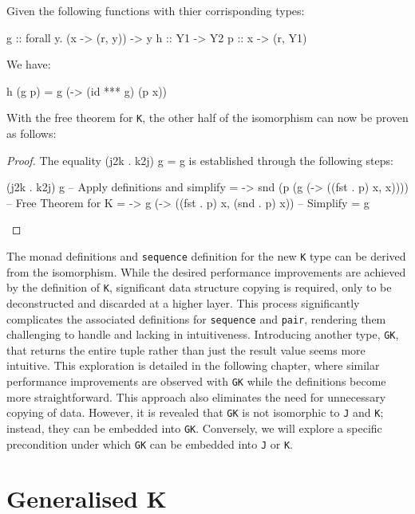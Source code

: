 \documentclass[runningheads]{llncs}
\begin{document}
\begin{theorem}
Given the following functions with thier corrisponding types:
  \begin{code}
  g :: forall y. (x -> (r, y)) -> y
  h :: Y1 -> Y2
  p :: x -> (r, Y1)
  \end{code}
  We have:
  \begin{code}
  h (g p) = g (\x -> (id *** g) (p x))
  \end{code}
\end{theorem}

With the free theorem for \texttt{K}, the other half of the isomorphism
can now be proven as follows:

\begin{proof}
The equality (j2k . k2j) g = g is established through the following steps:
  \begin{code}
  (j2k . k2j) g
  -- {{ Apply definitions and simplify}}
  = \p -> snd (p (g (\x -> ((fst . p) x, x))))
  -- {{ Free Theorem for K }}
  = \p -> g (\x -> ((fst . p) x, (snd . p) x))
  -- {{ Simplify }}
  = g
  \end{code}
\end{proof}

The monad definitions and \texttt{sequence} definition for the new
\texttt{K} type can be derived from the isomorphism. While the desired
performance improvements are achieved by the definition of \texttt{K},
significant data structure copying is required, only to be deconstructed
and discarded at a higher layer. This process significantly complicates
the associated definitions for \texttt{sequence} and \texttt{pair},
rendering them challenging to handle and lacking in intuitiveness.
Introducing another type, \texttt{GK}, that returns the entire tuple
rather than just the result value seems more intuitive. This exploration
is detailed in the following chapter, where similar performance
improvements are observed with \texttt{GK} while the definitions become
more straightforward. This approach also eliminates the need for
unnecessary copying of data. However, it is revealed that \texttt{GK} is
not isomorphic to \texttt{J} and \texttt{K}; instead, they can be
embedded into \texttt{GK}. Conversely, we will explore a specific
precondition under which \texttt{GK} can be embedded into \texttt{J} or
\texttt{K}.

\section{Generalised K}\label{generalised-k}
\end{document}
